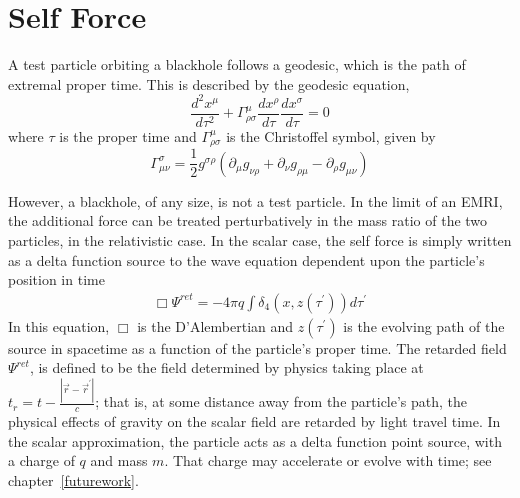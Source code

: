 

\section{Self Force}

A test particle orbiting a blackhole follows a geodesic, which is the path of extremal proper time. This is described by the geodesic equation,
\begin{equation}
\frac{d^2x^\mu}{d\tau^2}+\Gamma^\mu_{\rho\sigma}\frac{dx^\rho}{d\tau}\frac{dx^\sigma}{d\tau}=0
\end{equation}
where $\tau$ is the proper time and $\Gamma^\mu_{\rho\sigma}$ is the Christoffel symbol, given by~\cite{Carroll}
\begin{equation}
\Gamma^\sigma_{\mu\nu}=\frac{1}{2}g^{\sigma\rho}(\partial_\mu g_{\nu\rho}+\partial_\nu g_{\rho\mu} - \partial_\rho g_{\mu\nu})
\end{equation}

However, a blackhole, of any size, is not a test particle. In the limit of an EMRI, the additional force can be treated perturbatively in the mass ratio of the two particles, in the relativistic case. In the scalar case, the self force is simply written as a delta function source to the wave equation dependent upon the particle's position in time~\cite{WardellSelfForceReview}
\begin{eqnarray}
  \Box\Psi^{ret}=-4\pi q\int\delta_4(x,z(\tau^\prime))d\tau^\prime
\end{eqnarray}
In this equation, $\Box$ is the D'Alembertian and $z(\tau^\prime)$ is the evolving path of the source in spacetime as a function of the particle's proper time. The retarded field $\Psi^{ret}$, is defined to be the field determined by physics taking place at $t_r=t-\frac{|\vec{r}-\vec{r}^\prime|}{c}$; that is, at some distance away from the particle's path, the physical effects of gravity on the scalar field are retarded by light travel time. In the scalar approximation, the particle acts as a delta function point source, with a charge of $q$ and mass $m$. That charge may accelerate or evolve with time; see chapter~\ref{futurework}. 

